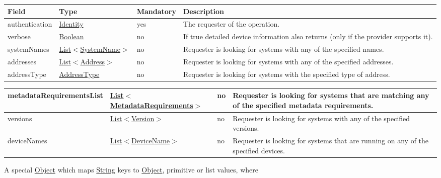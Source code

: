 \documentclass[a4paper]{arrowhead}
\newcommand{\pref}[1]{{\textcolor{ArrowheadGrey}{\hyperref[sec:model:primitives:#1]{#1}}}}
\begin{document}
\begin{table}[ht!]
\begin{tabularx}{\textwidth}{| p{4.4cm} | p{4.8cm} | p{2cm} | X |} \hline
\rowcolor{gray!33} Field & Type & Mandatory & Description \\ \hline
authentication & \hyperref[sec:model:Identity]{Identity} & yes & The requester of the operation. \\ \hline
verbose & \pref{Boolean} & no & If true detailed device information also returns (only if the provider supports it). \\ \hline
systemNames &  \pref{List}$<$\pref{SystemName}$>$ & no & Requester is looking for systems with any of the specified names. \\ \hline
addresses &  \pref{List}$<$\pref{Address}$>$ & no & Requester is looking for systems with any of the specified add\-resses.   \\ \hline
addressType &  \pref{AddressType} & no & Requester is looking for systems with the specified type of add\-ress. \\ \hline
\end{tabularx}
\end{table}

\begin{table}[ht!]
\begin{tabularx}{\textwidth}{| p{4.4cm} | p{4.8cm} | p{2cm} | X |} \hline
metadataRequirementsList & \pref{List}$<$\hyperref[sec:model:MetadataRequirements]{MetadataRequirements}$>$ & no & Requester is looking for systems that are matching any of the specified metadata requirements.  \\ \hline
versions &  \pref{List}$<$\pref{Version}$>$ & no & Requester is looking for systems with any of the specified versions.   \\ \hline
deviceNames &  \pref{List}$<$\pref{DeviceName}$>$ & no & Requester is looking for systems that are running on any of the specified devices. \\ \hline
\end{tabularx}
\end{table}


A special \pref{Object} which maps \pref{String} keys to \pref{Object}, primitive or list values, where 
\end{document}
